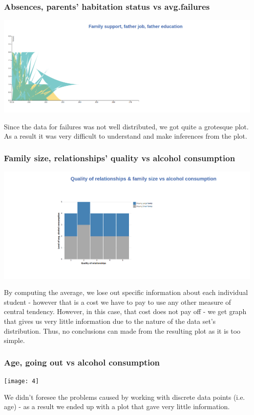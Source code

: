 \documentclass[titlepage, 12pt]{article}
\begin{document}
\subsubsection{Absences, parents' habitation status vs avg.failures}
\begin{center}
\includegraphics[scale=0.2]{5}
\end{center}
Since the data for failures was not well distributed, we got quite a grotesque
plot. As a result it was very difficult to understand and make inferences from
the plot.

\subsubsection{Family size, relationships' quality vs alcohol consumption}
\begin{center}
\includegraphics[scale=0.2]{8}
\end{center}
By computing the average, we lose out specific information about each individual
student - however that is a cost we have to pay to use any other measure of
central tendency. However, in this case, that cost does not pay off - we get
graph that gives us very little information due to the nature of the data set's
distribution. Thus, no conclusions can made from the resulting plot as it is too
simple.

\subsubsection{Age, going out vs alcohol consumption}
\begin{center}
\texttt{[image: 4]}
\end{center}
We didn't foresee the problems caused by working with discrete data points (i.e.
age) - as a result we ended up with a plot that gave very little information.
\end{document}
